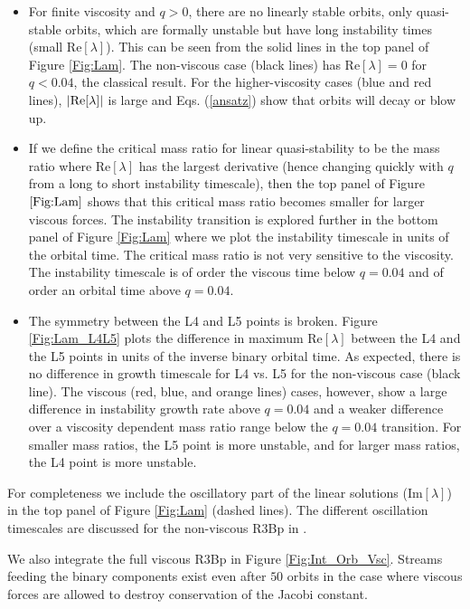 \documentclass[usenatbib]{mnras}
\begin{document}
\begin{itemize}
\item For finite viscosity and $q>0$, there are no linearly stable
  orbits, only quasi-stable orbits, which are formally unstable but
  have long instability times (small Re$[\lambda]$). This can be
  seen from the solid lines in the top panel of Figure
  \ref{Fig:Lam}. The non-viscous case (black lines) has Re$[\lambda]
  =0$ for $q<0.04$, the classical result. For the higher-viscosity
  cases (blue and red lines), $|\rm{Re}[\lambda]|$ is large and
  Eqs. (\ref{ansatz}) show that orbits will decay or blow up.
\item If we define the critical mass ratio for linear quasi-stability
  to be the mass ratio where Re$[\lambda]$ has the largest derivative
  (hence changing quickly with $q$ from a long to short instability
  timescale), then the top panel of Figure $\ref{Fig:Lam}$ shows that
  this critical mass ratio becomes smaller for larger viscous
  forces. The instability transition is explored further in the bottom
  panel of Figure \ref{Fig:Lam} where we plot the instability
  timescale in units of the orbital time. The critical mass ratio is
  not very sensitive to the viscosity. The instability timescale is of
  order the viscous time below $q=0.04$ and of order an orbital time
  above $q=0.04$.
\item The symmetry between the L4 and L5 points is broken. Figure
  \ref{Fig:Lam_L4L5} plots the difference in maximum Re$[\lambda]$ between
  the L4 and the L5 points in units of the inverse binary orbital time. As expected, there
  is no difference in growth timescale for L4 vs. L5 for the
  non-viscous case (black line). The viscous (red, blue, and orange
  lines) cases, however, show a large difference in instability growth
  rate above $q=0.04$ and a weaker difference over a viscosity
  dependent mass ratio range below the $q=0.04$ transition. For
  smaller mass ratios, the L5 point is more unstable, and for larger
  mass ratios, the L4 point is more unstable. 
\end{itemize}

For completeness we include the oscillatory part of the linear
solutions (Im$[\lambda]$) in the top panel of Figure \ref{Fig:Lam}
(dashed lines). The different oscillation timescales are discussed for
the non-viscous R3Bp in \citep{Murray:1994}.

We also integrate the full viscous R3Bp in Figure
\ref{Fig:Int_Orb_Vsc}. Streams feeding the binary components exist
even after $50$ orbits in the case where viscous forces are allowed
to destroy conservation of the Jacobi constant.
\end{document}
